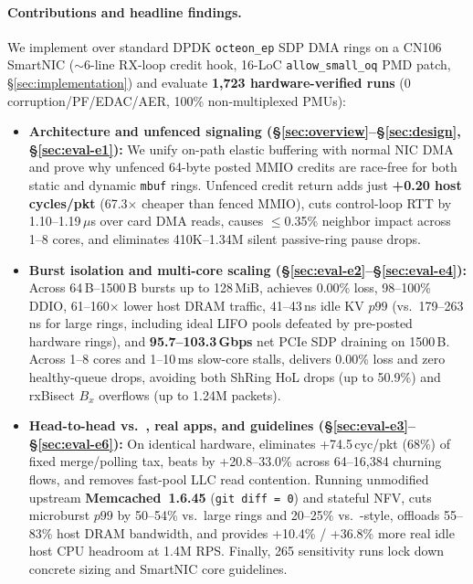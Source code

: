 \paragraph{Contributions and headline findings.}
We implement \sys{} over standard DPDK \texttt{octeon\_ep} SDP DMA rings on a
CN106 SmartNIC ($\sim$6-line RX-loop credit hook, 16-LoC \texttt{allow\_small\_oq}
PMD patch, \S\ref{sec:implementation}) and evaluate \textbf{1,723
hardware-verified runs} (0 corruption/PF/EDAC/AER, 100\% non-multiplexed PMUs):
\begin{itemize}
\item \textbf{Architecture and unfenced signaling (\S\ref{sec:overview}--\S\ref{sec:design},
  \S\ref{sec:eval-e1}):} We unify on-path elastic buffering with normal NIC DMA
  and prove why unfenced 64-byte posted MMIO credits are race-free for both
  static and dynamic \texttt{mbuf} rings. Unfenced credit return adds just
  \textbf{+0.20 host cycles/pkt} (67.3$\times$ cheaper than fenced MMIO), cuts
  control-loop RTT by 1.10--1.19\,$\mu$s over card DMA reads, causes
  $\le$0.35\% neighbor impact across 1--8 cores, and eliminates 410K--1.34M
  silent passive-ring pause drops.
\item \textbf{Burst isolation and multi-core scaling (\S\ref{sec:eval-e2}--\S\ref{sec:eval-e4}):}
  Across 64\,B--1500\,B bursts up to 128\,MiB, \sys{} achieves 0.00\% loss,
  98--100\% DDIO, 61--160$\times$ lower host DRAM traffic, 41--43\,ns idle KV
  $p99$ (vs.\ 179--263\,ns for large rings, including ideal LIFO pools defeated
  by pre-posted hardware rings), and \textbf{95.7--103.3\,Gbps} net PCIe SDP
  draining on 1500\,B. Across 1--8 cores and 1--10\,ms slow-core stalls, \sys{}
  delivers 0.00\% loss and zero healthy-queue drops, avoiding both ShRing HoL
  drops (up to 50.9\%) and rxBisect $B_x$ overflows (up to 1.24M packets).
\item \textbf{Head-to-head vs.\ \ceio{}, real apps, and guidelines (\S\ref{sec:eval-e3}--\S\ref{sec:eval-e6}):}
  On identical hardware, \sys{} eliminates +74.5\,cyc/pkt (68\%) of fixed
  \ceio{} merge/polling tax, beats \ceio{} by +20.8--33.0\% across 64--16,384
  churning flows, and removes fast-pool LLC read contention. Running unmodified
  upstream \textbf{Memcached~1.6.45} (\texttt{git diff = 0}) and stateful NFV,
  \sys{} cuts microburst $p99$ by 50--54\% vs.\ large rings and 20--25\% vs.\
  \ceio{}-style, offloads 55--83\% host DRAM bandwidth, and provides +10.4\%
  / +36.8\% more real idle host CPU headroom at 1.4M RPS. Finally, 265
  sensitivity runs lock down concrete sizing and SmartNIC core guidelines.
\end{itemize}
